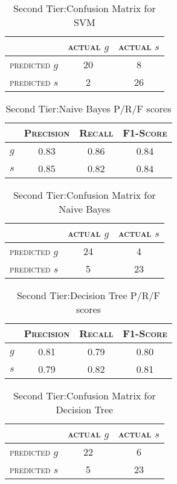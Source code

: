 \begin{table}[h]
	\center
	\begin{tabular}{ c | c  c }
		 & \textsc{actual $g$} & \textsc{actual $s$} \\
		\hline
		\textsc{predicted $g$} 	& 20 & 8 \\
		\textsc{predicted $s$}		& 2 & 26
	\end{tabular}
	\caption{Second Tier:Confusion Matrix for SVM}
\end{table}

\begin{table}[h]
	\center
	\begin{tabular}{ c | c  c  c }
		& \textsc{Precision} & \textsc{Recall} & \textsc{F1-Score} \\
		\hline
		\textsc{$g$} 	& 0.83 & 0.86 & 0.84 \\
		\textsc{$s$}	& 0.85 & 0.82 & 0.84
	\end{tabular}
	\caption{Second Tier:Naive Bayes P/R/F scores}
\end{table}

\begin{table}[h]
	\center
	\begin{tabular}{ c | c  c }
		 & \textsc{actual $g$} & \textsc{actual $s$} \\
		\hline
		\textsc{predicted $g$} 	& 24 & 4 \\
		\textsc{predicted $s$}		& 5 & 23
	\end{tabular}
	\caption{Second Tier:Confusion Matrix for Naive Bayes}
\end{table}

\begin{table}[h]
	\center
	\begin{tabular}{ c | c  c  c }
		& \textsc{Precision} & \textsc{Recall} & \textsc{F1-Score} \\
		\hline
		\textsc{$g$} 	& 0.81 & 0.79 & 0.80 \\
		\textsc{$s$}	& 0.79 & 0.82 & 0.81
	\end{tabular}
	\caption{Second Tier:Decision Tree P/R/F scores}
\end{table}

\begin{table}[h]
	\center
	\begin{tabular}{ c | c  c }
		 & \textsc{actual $g$} & \textsc{actual $s$} \\
		\hline
		\textsc{predicted $g$} 	& 22 & 6 \\
		\textsc{predicted $s$}		& 5 & 23
	\end{tabular}
	\caption{Second Tier:Confusion Matrix for Decision Tree}
\end{table}